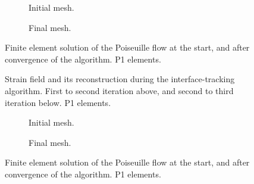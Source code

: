\documentclass[11 pt]{report}
\begin{document}
\begin{figure}[b]
    \centering
    \begin{subfigure}[t]{\textwidth}
        
        \caption{Initial mesh.}
    \end{subfigure}
    \begin{subfigure}[t]{\textwidth}
        
        \caption{Final mesh.}
    \end{subfigure}
    \caption{Finite element solution of the Poiseuille flow at the start, and after convergence of the algorithm. P1 elements.}
    \label{fig:tracking_1D_P1}
\end{figure}


\begin{figure}[b]
    \centering
    \begin{subfigure}[t]{\textwidth}
        
        \label{subfig:tracking_1D_P2_step_1}
    \end{subfigure}
    \begin{subfigure}[t]{\textwidth}
        
    \end{subfigure}
    \caption{Strain field and its reconstruction during the interface-tracking algorithm. First to second iteration above, and second to third iteration below. P1 elements.}
    \label{fig:tracking_1D_P2_steps}
\end{figure}

\begin{figure}[b]
    \centering
    \begin{subfigure}[t]{\textwidth}
        
        \caption{Initial mesh.}
    \end{subfigure}
    \begin{subfigure}[t]{\textwidth}
        
        \caption{Final mesh.}
    \end{subfigure}
    \caption{Finite element solution of the Poiseuille flow at the start, and after convergence of the algorithm. P1 elements.}
    \label{fig:tracking_1D_P2}
\end{figure}
\end{document}
